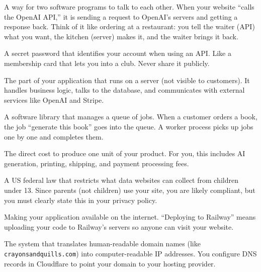 \documentclass[12pt, letterpaper, oneside]{book}
\begin{document}
\begin{description}[style=nextline, leftmargin=2em, itemsep=6pt]

\item[API (Application Programming Interface)]
A way for two software programs to talk to each other. When your website ``calls the OpenAI API,'' it is sending a request to OpenAI's servers and getting a response back. Think of it like ordering at a restaurant: you tell the waiter (API) what you want, the kitchen (server) makes it, and the waiter brings it back.

\item[API Key]
A secret password that identifies your account when using an API. Like a membership card that lets you into a club. Never share it publicly.

\item[Backend]
The part of your application that runs on a server (not visible to customers). It handles business logic, talks to the database, and communicates with external services like OpenAI and Stripe.

\item[BullMQ]
A software library that manages a queue of jobs. When a customer orders a book, the job ``generate this book'' goes into the queue. A worker process picks up jobs one by one and completes them.

\item[COGS (Cost of Goods Sold)]
The direct cost to produce one unit of your product. For you, this includes AI generation, printing, shipping, and payment processing fees.

\item[COPPA (Children's Online Privacy Protection Act)]
A US federal law that restricts what data websites can collect from children under 13. Since parents (not children) use your site, you are likely compliant, but you must clearly state this in your privacy policy.

\item[Deploy / Deployment]
Making your application available on the internet. ``Deploying to Railway'' means uploading your code to Railway's servers so anyone can visit your website.

\item[DNS (Domain Name System)]
The system that translates human-readable domain names (like \texttt{crayonsandquills.com}) into computer-readable IP addresses. You configure DNS records in Cloudflare to point your domain to your hosting provider.


\end{description}
\end{document}
